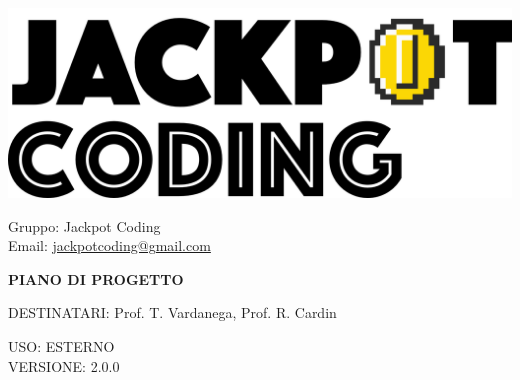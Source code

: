 \documentclass[5pt]{article}
\begin{document}
\begin{minipage}[t]{0.50\textwidth}
    \begin{flushleft}
        \hspace{10pt}
        \includegraphics[scale=0.65]{jackpot-logo.png} 
    \end{flushleft}
\end{minipage}
\hspace{-60pt} %
\begin{flushright}
    \begin{minipage}[t]{0.50\textwidth}
        \begin{flushright}
            Gruppo: {\Large Jackpot Coding}\\
            Email: \href{mailto:jackpotcoding@gmail.com}{jackpotcoding@gmail.com}
        \end{flushright}
    \end{minipage}
\end{flushright}

\vspace{24pt}

\begin{center}
    \textbf{\LARGE PIANO DI PROGETTO}
\end{center}

\vspace{13pt}

\begin{flushleft}
    \begin{spacing}{1.5}
        DESTINATARI: Prof. T. Vardanega, Prof. R. Cardin\\%
    \end{spacing}
\end{flushleft}

\begin{flushright}
    \begin{spacing}{1}
        USO: ESTERNO\\
        VERSIONE: 2.0.0\\
    \end{spacing}
\end{flushright}
\end{document}
